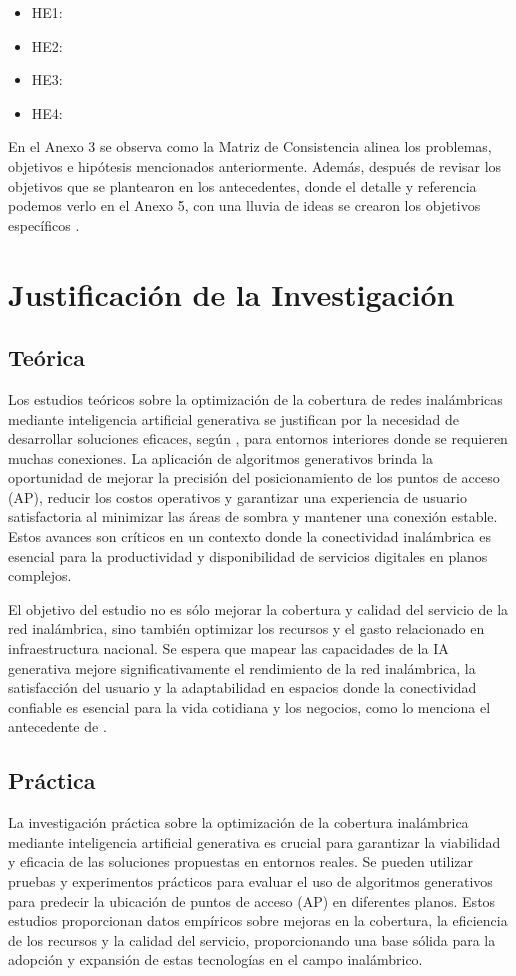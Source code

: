 \begin{itemize}
	\item HE1: \Hone
	\item HE2: \Htwo
	\item HE3: \Hthree
	\item HE4: \Hfour
\end{itemize}

En el Anexo 3 se observa como la Matriz de Consistencia alinea los problemas, objetivos e hipótesis mencionados anteriormente. Además, después de revisar los objetivos que se plantearon en los antecedentes, donde el detalle y referencia podemos verlo en el Anexo 5, con una lluvia de ideas se crearon los objetivos específicos .

\section{Justificación de la Investigación}

\subsection{Teórica}
Los estudios teóricos sobre la optimización de la cobertura de redes inalámbricas mediante inteligencia artificial generativa se justifican por la necesidad de desarrollar soluciones eficaces, según \cite{pr_nauata2021housegan}, para entornos interiores donde se requieren muchas conexiones. La aplicación de algoritmos generativos brinda la oportunidad de mejorar la precisión del posicionamiento de los puntos de acceso (AP), reducir los costos operativos y garantizar una experiencia de usuario satisfactoria al minimizar las áreas de sombra y mantener una conexión estable. Estos avances son críticos en un contexto donde la conectividad inalámbrica es esencial para la productividad y disponibilidad de servicios digitales en planos complejos. 

El objetivo del estudio no es sólo mejorar la cobertura y calidad del servicio de la red inalámbrica, sino también optimizar los recursos y el gasto relacionado en infraestructura nacional. Se espera que mapear las capacidades de la IA generativa mejore significativamente el rendimiento de la red inalámbrica, la satisfacción del usuario y la adaptabilidad en espacios donde la conectividad confiable es esencial para la vida cotidiana y los negocios, como lo menciona el antecedente de \cite{pr_alathari2023optaps}.

\subsection{Práctica}
La investigación práctica sobre la optimización de la cobertura inalámbrica mediante inteligencia artificial generativa es crucial para garantizar la viabilidad y eficacia de las soluciones propuestas en entornos reales. Se pueden utilizar pruebas y experimentos prácticos para evaluar el uso de algoritmos generativos para predecir la ubicación de puntos de acceso (AP) en diferentes planos. Estos estudios proporcionan datos empíricos sobre mejoras en la cobertura, la eficiencia de los recursos y la calidad del servicio, proporcionando una base sólida para la adopción y expansión de estas tecnologías en el campo inalámbrico.

